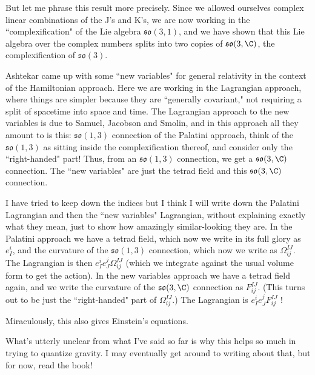 But let me phrase this result more precisely. Since we allowed ourselves complex linear combinations of the J's and K's, we are now working in the ``complexification" of the Lie algebra $\mathfrak{so}(3,1)$, and we have shown that this Lie algebra over the complex numbers splits into two copies of $\mathfrak{so}(3,\C)$, the complexification of $\mathfrak{so}(3)$.

Ashtekar came up with some ``new variables" for general relativity in the context of the Hamiltonian approach. Here we are working in the Lagrangian approach, where things are simpler because they are ``generally covariant," not requiring a split of spacetime into space and time. The Lagrangian approach to the new variables is due to Samuel, Jacobson and Smolin, and in this approach all they amount to is this: $\mathfrak{so}(1,3)$ connection of the Palatini approach, think of the$\mathfrak{so}(1,3)$ as sitting inside the complexification thereof, and consider only the ``right-handed" part! Thus, from an $\mathfrak{so}(1,3)$ connection, we get a $\mathfrak{so}(3,\C)$ connection. The ``new variables" are just the tetrad field and this $\mathfrak{so}(3,\C)$ connection.

I have tried to keep down the indices but I think I will write down the Palatini Lagrangian and then the ``new variables" Lagrangian, without explaining exactly what they mean, just to show how amazingly similar-looking they are. In the Palatini approach we have a tetrad field, which now we write in its full glory as $e_I^i$, and the curvature of the $\mathfrak{so}(1,3)$ connection, which now we write as $\Omega_{ij}^{IJ}$. The Lagrangian is then
$e_I^i e_J^j \Omega_{ij}^{IJ}$
(which we integrate against the usual volume form to get the action). In the new variables approach we have a tetrad field again, and we write the curvature of the $\mathfrak{so}(3,\C)$  connection as $F_{ij}^{IJ}$. (This turns out to be just the ``right-handed" part of  $\Omega_{ij}^{IJ}$.) The Lagrangian is
$e_I^i e_J^j F_{ij}^{IJ}$ !

Miraculously, this also gives Einstein's equations.

What's utterly unclear from what I've said so far is why this helps so much in trying to quantize gravity. I may eventually get around to writing about that, but for now, read the book!



